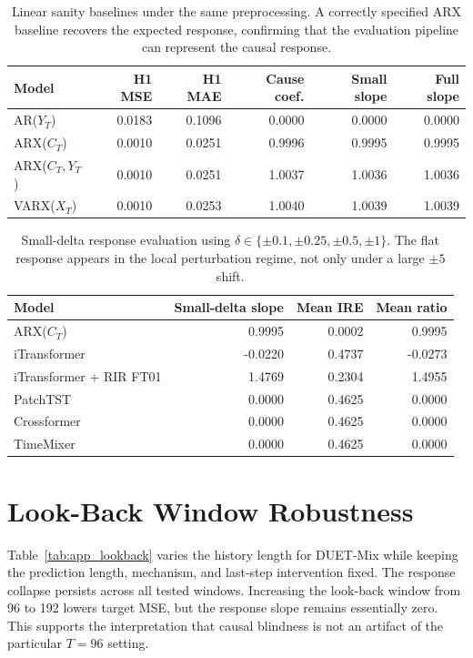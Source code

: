 \documentclass{article}
\begin{document}
\begin{table}[htbp]
\centering
\caption{Linear sanity baselines under the same preprocessing. A correctly
specified ARX baseline recovers the expected response, confirming that the
evaluation pipeline can represent the causal response.}
\label{tab:app_linear_sanity}
\begin{tabular}{lrrrrr}
\toprule
Model & H1 MSE & H1 MAE & Cause coef. & Small slope & Full slope \\
\midrule
AR($Y_T$) & 0.0183 & 0.1096 & 0.0000 & 0.0000 & 0.0000 \\
ARX($C_T$) & 0.0010 & 0.0251 & 0.9996 & 0.9995 & 0.9995 \\
ARX($C_T,Y_T$) & 0.0010 & 0.0251 & 1.0037 & 1.0036 & 1.0036 \\
VARX($X_T$) & 0.0010 & 0.0253 & 1.0040 & 1.0039 & 1.0039 \\
\bottomrule
\end{tabular}
\end{table}

\begin{table}[htbp]
\centering
\caption{Small-delta response evaluation using
$\delta\in\{\pm0.1,\pm0.25,\pm0.5,\pm1\}$. The flat response appears in the local
perturbation regime, not only under a large $\pm5$ shift.}
\label{tab:app_small_delta}
\begin{tabular}{lrrr}
\toprule
Model & Small-delta slope & Mean IRE & Mean ratio \\
\midrule
ARX($C_T$) & 0.9995 & 0.0002 & 0.9995 \\
iTransformer & -0.0220 & 0.4737 & -0.0273 \\
iTransformer + RIR FT01 & 1.4769 & 0.2304 & 1.4955 \\
PatchTST & 0.0000 & 0.4625 & 0.0000 \\
Crossformer & 0.0000 & 0.4625 & 0.0000 \\
TimeMixer & 0.0000 & 0.4625 & 0.0000 \\
\bottomrule
\end{tabular}
\end{table}

\section{Look-Back Window Robustness}
\label{app:lookback}

Table~\ref{tab:app_lookback} varies the history length for DUET-Mix while keeping
the prediction length, mechanism, and last-step intervention fixed. The response
collapse persists across all tested windows. Increasing the look-back window from
96 to 192 lowers target MSE, but the response slope remains essentially zero. This
supports the interpretation that causal blindness is not an artifact of the
particular $T=96$ setting.
\end{document}

